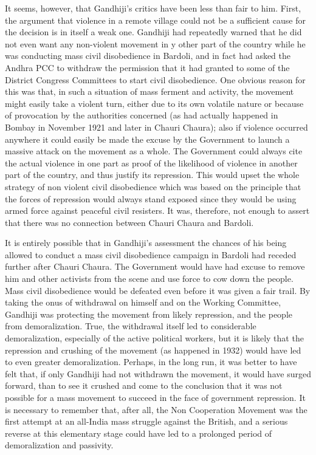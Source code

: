 It seems, however, that Gandhiji's critics have been less than fair to him. First, the argument that violence in a remote village could not be a sufficient cause for the decision is in itself a weak one. Gandhiji had repeatedly warned that he did not even want any non-violent movement in y other part of the country while he was conducting mass civil disobedience in Bardoli, and in fact had asked the Andhra PCC to withdraw the permission that it had granted to some of the District Congress Committees to start civil disobedience. One obvious reason for this was that, in such a situation of mass ferment and activity, the movement might easily take a violent turn, either due to its own volatile nature or because of provocation by the authorities concerned (as had actually happened in Bombay in November 1921 and later in Chauri Chaura); also if violence occurred anywhere it could easily be made the excuse by the Government to launch a massive attack on the movement as a whole. The Government could always cite the actual violence in one part as proof of the likelihood of violence in another part of the country, and thus justify its repression. This would upset the whole strategy of non violent civil disobedience which was based on the principle that the forces of repression would always stand exposed since they would be using armed force against peaceful civil resisters. It was, therefore, not enough to assert that there was no connection between Chauri Chaura and Bardoli. 

It is entirely possible that in Gandhiji's assessment the chances of his being allowed to conduct a mass civil disobedience campaign in Bardoli had receded further after Chauri Chaura. The Government would have had excuse to remove him and other activists from the scene and use force to cow down the people. Mass civil disobedience would be defeated even before it was given a fair trail. By taking the onus of withdrawal on himself and on the Working Committee, Gandhiji was protecting the movement from likely repression, and the people from demoralization. True, the withdrawal itself led to considerable demoralization, especially of the active political workers, but it is likely that the repression and crushing of the movement (as happened in 1932) would have led to even greater demoralization. Perhaps, in the long run, it was better to have felt that, if only Gandhiji had not withdrawn the movement, it would have surged forward, than to see it crushed and come to the conclusion that it was not possible for a mass movement to succeed in the face of government repression. It is necessary to remember that, after all, the Non Cooperation Movement was the first attempt at an all-India mass struggle against the British, and a serious reverse at this elementary stage could have led to a prolonged period of demoralization and passivity. 

